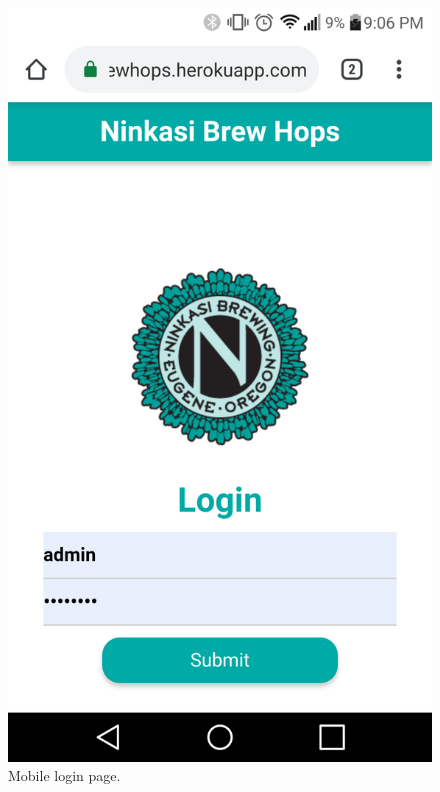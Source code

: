\documentclass[draftclsnofoot,onecolumn,journal,letterpaper,compsoc,10pt]{IEEEtran}
\begin{document}
\begin{figure}[H]
    \centering
    \includegraphics[height=0.4\textheight]{screenshots/progress_report_screencap-mobile_login.png}
    \caption{Mobile login page.}
\end{figure}
\end{document}

